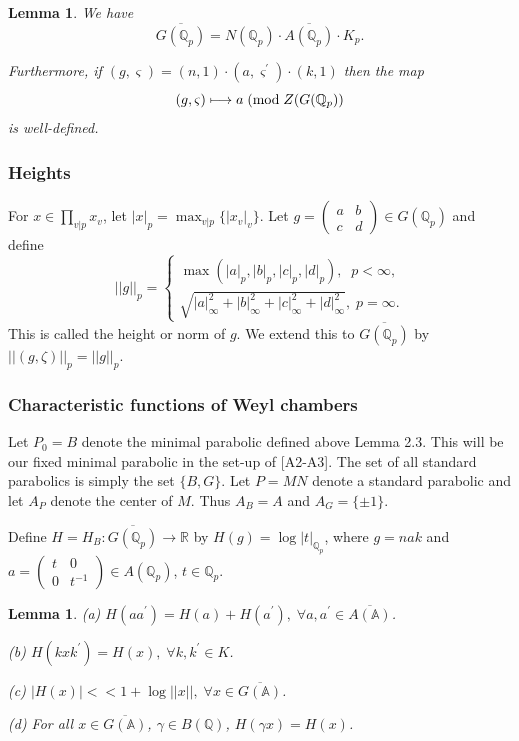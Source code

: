\documentclass[12pt]{article}
\newtheorem{lemma}[theorem]{Lemma}
\def\aaa{\mathbb{A}}
\def\qqq{\mathbb{Q}}
\begin{document}
\begin{lemma}
We have 
\[
\overline{G(\qqq_p)}=N(\qqq_p)\cdot \overline{A(\qqq_p)}\cdot K_p.
\]

Furthermore, if $(g,\varsigma )=(n,1)\cdot (a,\varsigma ^{\prime })\cdot
(k,1)$ then the map 
\[
(g,\varsigma )\longmapsto a\;({\rm mod}\;Z(G(\qqq_p))
\]
is well-defined.
\end{lemma}

\subsubsection{Heights}

For $x\in \prod_{v|p}x_v$, let $|x|_p={\max }_{v | p}\{|x_v|_v\}$.
Let $g=\left( 
\begin{array}{cc}
a & b \\ 
c & d
\end{array}
\right) \in G(\qqq_p)$ and define 
\[
||g||_p=\left\{ 
\begin{array}{c}
\max (|a|_p,|b|_p,|c|_p,|d|_p),\;\;p<\infty , \\ 
\sqrt{|a|_\infty ^2+|b|_\infty ^2+|c|_\infty ^2+|d|_\infty ^2},\;p=\infty .
\end{array}
\right. 
\]
This is called the height or norm of $g$. We extend this to
$\overline{G({\qqq}_p)}$ by $||(g,\zeta)||_p=||g||_p$.

\subsubsection{Characteristic functions of Weyl chambers}

Let $P_0=B$ denote the minimal parabolic defined above Lemma 2.3.
This will be our fixed
minimal parabolic in the set-up of [A2-A3]. The set of all standard
parabolics is simply the set $\{B,G\}$. Let $P=MN$ denote a standard
parabolic and let $A_P$ denote the center of $M$. Thus $A_B=A$ and
$A_G=\{\pm 1\}$.

Define $H=H_B:\overline{G(\qqq_p)}\rightarrow \mathbb{R}$
by $H(g)=\log |t|_{\qqq_p}$, where $g=nak$ and $a=\left( 
\begin{array}{cc}
t & 0 \\ 
0 & t^{-1}
\end{array}
\right) \in A(\qqq_p)$, $t\in \qqq_p$.

\begin{lemma}
(a) $H(aa^{\prime })=H(a)+H(a^{\prime }),
\;\forall a,a^{\prime }\in \overline{A(\aaa )}$.

(b) $H(kxk^{\prime })=H(x),\;\forall k,k^{\prime }\in K$.

(c) $|H(x)|<<1+\log ||x||,\;\forall x\in \overline{G(\aaa )}$.

(d) For all $x\in \overline{G(\aaa )}$,
$\gamma \in B(\qqq)$, $H(\gamma x)=H(x)$.
\end{lemma}
\end{document}
